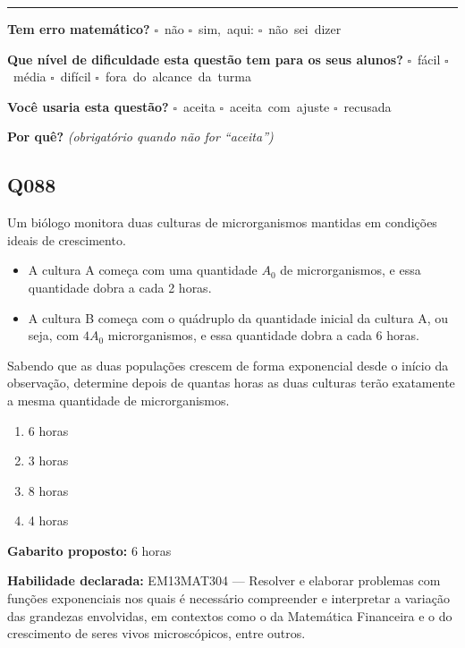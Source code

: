 \documentclass[11pt,a4paper]{article}
\begin{document}
\noindent\rule{\linewidth}{0.4pt}
\textbf{Tem erro matemático?}\quad
\mbox{$\square$~não} \quad \mbox{$\square$~sim, aqui:} \underline{\hspace{5cm}}
\quad \mbox{$\square$~não sei dizer}

\textbf{Que nível de dificuldade esta questão tem para os seus alunos?}\quad
\mbox{$\square$~fácil} \quad \mbox{$\square$~média} \quad
\mbox{$\square$~difícil} \quad \mbox{$\square$~fora do alcance da turma}

\textbf{Você usaria esta questão?}\quad
\mbox{$\square$~aceita} \quad \mbox{$\square$~aceita com ajuste} \quad
\mbox{$\square$~recusada}

\textbf{Por quê?} \emph{(obrigatório quando não for ``aceita'')}

\underline{\hspace{\linewidth}}

\underline{\hspace{\linewidth}}
\vspace{0.6em}

\begin{samepage}
\subsection*{Q088}
Um biólogo monitora duas culturas de microrganismos mantidas em condições ideais de crescimento.

\begin{itemize}[nosep,leftmargin=*]
\item A cultura A começa com uma quantidade $A_0$ de microrganismos, e essa quantidade dobra a cada 2 horas.
\item A cultura B começa com o quádruplo da quantidade inicial da cultura A, ou seja, com $4A_0$ microrganismos, e essa quantidade dobra a cada 6 horas.
\end{itemize}

Sabendo que as duas populações crescem de forma exponencial desde o início da observação, determine depois de quantas horas as duas culturas terão exatamente a mesma quantidade de microrganismos.
\begin{enumerate}[label=(\alph*),nosep,leftmargin=*]
\item 6 horas
\item 3 horas
\item 8 horas
\item 4 horas
\end{enumerate}

\textbf{Gabarito proposto:} 6 horas

\textbf{Habilidade declarada:} EM13MAT304 --- Resolver e elaborar problemas com funções exponenciais nos quais é necessário compreender e interpretar a variação das grandezas envolvidas, em contextos como o da Matemática Financeira e o do crescimento de seres vivos microscópicos, entre outros.
\end{samepage}
\end{document}
